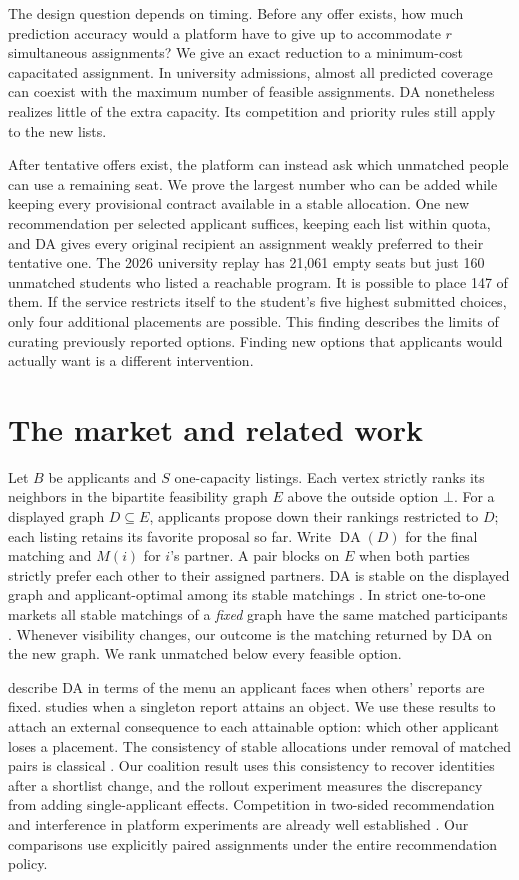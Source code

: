 \documentclass[format=acmsmall,review=false]{acmart}
\newcommand{\da}{\operatorname{DA}}
\begin{document}
The design question depends on timing. Before any offer exists, how much prediction accuracy would a platform have to give up to accommodate $r$ simultaneous assignments? We give an exact reduction to a minimum-cost capacitated assignment. In university admissions, almost all predicted coverage can coexist with the maximum number of feasible assignments. DA nonetheless realizes little of the extra capacity. Its competition and priority rules still apply to the new lists.

After tentative offers exist, the platform can instead ask which unmatched people can use a remaining seat. We prove the largest number who can be added while keeping every provisional contract available in a stable allocation. One new recommendation per selected applicant suffices, keeping each list within quota, and DA gives every original recipient an assignment weakly preferred to their tentative one. The 2026 university replay has 21,061 empty seats but just 160 unmatched students who listed a reachable program. It is possible to place 147 of them. If the service restricts itself to the student's five highest submitted choices, only four additional placements are possible. This finding describes the limits of curating previously reported options. Finding new options that applicants would actually want is a different intervention.

\section{The market and related work}
Let $B$ be applicants and $S$ one-capacity listings. Each vertex strictly ranks its neighbors in the bipartite feasibility graph $E$ above the outside option $\bot$. For a displayed graph $D\subseteq E$, applicants propose down their rankings restricted to $D$; each listing retains its favorite proposal so far. Write $\da(D)$ for the final matching and $M(i)$ for $i$'s partner. A pair blocks on $E$ when both parties strictly prefer each other to their assigned partners. DA is stable on the displayed graph and applicant-optimal among its stable matchings \citep{gale1962}. In strict one-to-one markets all stable matchings of a \emph{fixed} graph have the same matched participants \citep{galesoto,roth1986}. Whenever visibility changes, our outcome is the matching returned by DA on the new graph. We rank unmatched below every feasible option.

\citet{menus} describe DA in terms of the menu an applicant faces when others' reports are fixed. \citet{papai} studies when a singleton report attains an object. We use these results to attach an external consequence to each attainable option: which other applicant loses a placement. The consistency of stable allocations under removal of matched pairs is classical \citep{sasaki}. Our coalition result uses this consistency to recover identities after a shortlist change, and the rollout experiment measures the discrepancy from adding single-applicant effects. Competition in two-sided recommendation and interference in platform experiments are already well established \citep{rankings,johari2022}. Our comparisons use explicitly paired assignments under the entire recommendation policy.
\end{document}
